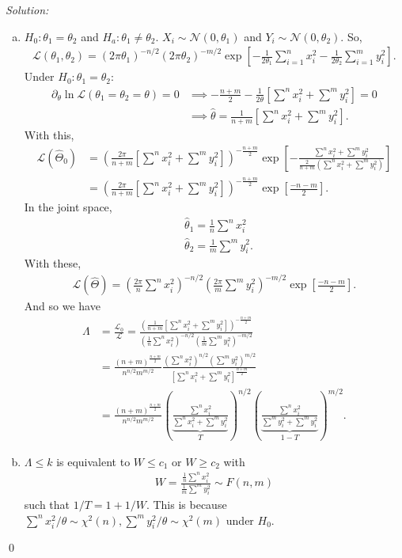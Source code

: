 \documentclass{book}
\theoremstyle{definition}
\newcommand{\p}{\partial}
\newcommand{\lag}{\mathcal{L}}
\newcommand{\nn}{\nonumber}
\newcommand{\N}{\mathcal{N}}
\newcommand{\f}[2]{\frac{#1}{#2}}
\newcommand{\lp}{\left(}
\newcommand{\rp}{\right)}
\newcommand{\lb}{\left[}
\newcommand{\rb}{\right]}
\begin{document}
\noindent \textit{Solution:} 
\begin{enumerate}[(a)]
	\item $H_0 : \theta_1 = \theta_2$ and $H_a : \theta_1 \neq \theta_2$. $X_i \sim \N(0,\theta_1)$ and $Y_i \sim \N(0, \theta_2)$. So,
	\begin{align}
	\lag(\theta_1,\theta_2) = (2\pi \theta_1)^{-n/2}(2\pi \theta_2)^{-m/2} \exp \lb -\f{1}{2\theta_1}\sum^n_{i=1} x_i^2  - \f{1}{2\theta_2}\sum^m_{i=1} y_i^2 \rb.
	\end{align}
	Under $H_0: \theta_1 = \theta_2$:
	\begin{align}
	\p_\theta \ln \lag(\theta_1 = \theta_2 = \theta) = 0 &\implies -\f{n+m}{2} -\f{1}{2\theta}\lb \sum^n x_i^2 + \sum^m y_i^2 \rb  = 0 \nn\\
	&\implies \hat\theta = \f{1}{n+m} \lb  \sum^n x_i^2 + \sum^m y_i^2 \rb.
	\end{align}
	With this, 
	\begin{align}
	\lag(\hat\Theta_0) &= \lp \f{2\pi}{n+m}\lb \sum^n x_i^2 + \sum^m y_i^2 \rb \rp^{-\f{n+m}{2}} \exp\lb -\f{\sum^n x_i^2 + \sum^m y_i^2}{\f{2}{n+m}\lp \sum^n x_i^2 + \sum^m y_i^2 \rp}  \rb\nn\\
	&= \lp \f{2\pi}{n+m}\lb \sum^n x_i^2 + \sum^m y_i^2 \rb \rp^{-\f{n+m}{2}} \exp\lb \f{-n-m}{2}\rb.
	\end{align}
	In the joint space, 
	\begin{align}
	&\hat\theta_1 = \f{1}{n}\sum^n x_i^2\nn\\
	&\hat\theta_2 = \f{1}{m}\sum^m y_i^2.
	\end{align}
	With these,
	\begin{align}
	\lag(\hat\Theta) = \lp \f{2\pi}{n}\sum^n x_i^2 \rp^{-n/2} \lp \f{2\pi}{m}\sum^m y_i^2 \rp^{-m/2} \exp\lb \f{-n-m}{2} \rb.
	\end{align}
	And so we have
	\begin{align}
	\Lambda &= \f{\lag_0}{\lag} = \f{\lp \f{1}{n+m}\lb \sum^n x_i^2 + \sum^m y_i^2 \rb \rp^{-\f{n+m}{2}}}{\lp \f{1}{n}\sum^n x_i^2 \rp^{-n/2} \lp \f{1}{m}\sum^m y_i^2 \rp^{-m/2}}\nn\\
	&= \f{(n+m)^{\f{n+m}{2}}}{n^{n/2} m^{m/2}} \f{\lp \sum^n x_i^2 \rp^{n/2} \lp \sum^m y_i^2 \rp^{m/2}}{\lb \sum^n x_i^2 + \sum^m y_i^2 \rb ^{\f{n+m}{2}}}\nn\\
	&= \f{(n+m)^{\f{n+m}{2}}}{n^{n/2} m^{m/2}} \lp \underbrace{\f{\sum^n x_i^2}{\sum^n x_i^2 + \sum^m y_i^2 }}_{T} \rp^{n/2} \lp\underbrace{ \f{\sum^n x_i^2}{\sum^m y_i^2 + \sum^m y_i^2 }}_{1-T}  \rp^{m/2}.
	\end{align}
	
	
	\item $\Lambda \leq k$ is equivalent to $W \leq c_1$ or $W \geq c_2$ with 
	\begin{align}
	\boxed{W = \f{\f{1}{n}\sum^n x_i^2 }{\f{1}{m}\sum^m y_i^2} \sim F(n,m)}
	\end{align}
	such that $1/T = 1 + 1/W$. This is because $\sum^n x_i^2/\theta \sim \chi^2(n), \sum^m y_i^2/\theta \sim \chi^2(m)$ under $H_0$.
\end{enumerate}\qed
\end{document}
